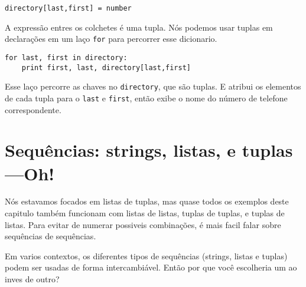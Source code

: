 \beforeverb
\begin{verbatim}
directory[last,first] = number
\end{verbatim}
\afterverb
%
A expressão entres os colchetes é uma tupla. Nós podemos usar
tuplas em declarações em um laço {\tt for} para percorrer esse
dicionario.


\beforeverb
\begin{verbatim}
for last, first in directory:
    print first, last, directory[last,first]
\end{verbatim}
\afterverb
%
Esse laço percorre as chaves no {\tt directory}, que são tuplas. E
atribui os elementos de cada tupla para o {\tt last} e {\tt first},
então exibe o nome do número de telefone correspondente.

\section{Sequências: strings, listas, e tuplas---Oh!}

Nós estavamos focados em listas de tuplas, mas quase todos os exemplos
deste capitulo também funcionam com listas de listas, tuplas de tuplas,
e tuplas de listas. Para evitar de numerar possiveis combinações, é
mais facil falar sobre sequências de sequências.

Em varios contextos, os diferentes tipos de sequências (strings, listas e
tuplas) podem ser usadas de forma intercambiável. Então por que você
escolheria um ao inves de outro?

